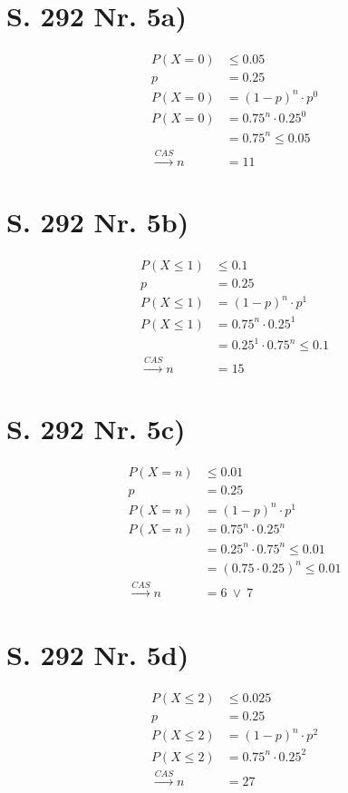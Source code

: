 \documentclass[12pt,a4paper]{report}
\begin{document}
	\tableofcontents
	\newpage
	\section{S. 292 Nr. 5a)}
	\begin{align*}
		P(X = 0) &\leq 0.05 \\
		p &= 0.25 \\
		P(X = 0) &= (1-p)^n \cdot p^0 \\
		P(X = 0) &= 0.75^n \cdot 0.25^0 \\
		&= 0.75^n \leq 0.05 \\
		\xrightarrow{CAS} n&= 11
	\end{align*}
	\section{S. 292 Nr. 5b)}
	\begin{align*}
		P(X \leq 1) &\leq 0.1 \\
		p &= 0.25 \\
		P(X \leq 1) &= (1-p)^n \cdot p^1 \\
		P(X \leq 1) &= 0.75^n \cdot 0.25^1 \\
		&= 0.25^1 \cdot 0.75^n \leq 0.1 \\
		\xrightarrow{CAS} n&= 15
	\end{align*}
	\section{S. 292 Nr. 5c)}
	\begin{align*}
		P(X = n) &\leq 0.01 \\
		p &= 0.25 \\
		P(X = n) &= (1-p)^n \cdot p^1 \\
		P(X = n) &= 0.75^n \cdot 0.25^n \\
		&= 0.25^n \cdot 0.75^n \leq 0.01 \\
		&= (0.75 \cdot 0.25)^n \leq 0.01 \\
		\xrightarrow{CAS} n&= 6\ \lor\ 7
	\end{align*}
	\section{S. 292 Nr. 5d)}
	\begin{align*}
		P(X \leq 2) &\leq 0.025 \\
		p &= 0.25 \\
		P(X \leq 2) &= (1-p)^n \cdot p^2 \\
		P(X \leq 2) &= 0.75^n \cdot 0.25^2 \\
		\xrightarrow{CAS} n&= 27
	\end{align*}
\end{document}
